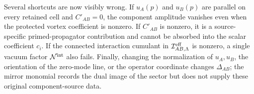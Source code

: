 \begin{controlledapproximation}
\begin{equation}
  \label{eq:glsm-one-vortex-component-cell-bound}
\end{equation}
Several shortcuts are now visibly wrong.  If \(u_A(p)\) and \(u_B(p)\) are
parallel on every retained cell and \(C'_{AB}=0\), the component amplitude
vanishes even when the protected vortex coefficient is nonzero.  If
\(C'_{AB}\) is nonzero, it is a source-specific primed-propagator contribution
and cannot be absorbed into the scalar coefficient \(c_i\).  If the connected
interaction cumulant in
\(\mathcal I^{\rm eff}_{AB,\Lambda}\) is nonzero, a single vacuum factor
\(\mathcal N^{\rm int}\) also fails.  Finally, changing the normalization of
\(u_A,u_B\), the orientation of the zero-mode line, or the operator coordinate
changes \(\Delta_{AB}\); the mirror monomial records the dual image of the
sector but does not supply these original component-source data.
\end{controlledapproximation}


